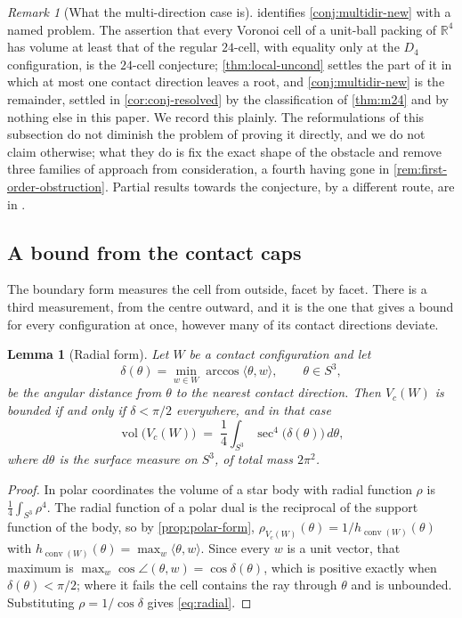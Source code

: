 \documentclass[11pt,reqno]{amsart}
\renewcommand{\_}{\origunderscore\allowbreak}
\numberwithin{equation}{section}
\theoremstyle{plain}
\newtheorem{lem}[thm]{Lemma}
\theoremstyle{definition}
\theoremstyle{remark}
\newtheorem{remark}[thm]{Remark}
\DeclareMathOperator{\vol}{vol}
\DeclareMathOperator{\conv}{conv}
\begin{document}
\begin{remark}[What the multi-direction case is]\label{rem:is-24cell}
 identifies \cref{conj:multidir-new} with a named
problem. The assertion that every Voronoi cell of a unit-ball
packing of $\mathbb{R}^4$ has volume at least that of the regular
$24$-cell, with equality only at the $D_4$ configuration, is the
$24$-cell conjecture; \cref{thm:local-uncond} settles the part of it in
which at most one contact direction leaves a root, and
\cref{conj:multidir-new} is the remainder, settled in
\cref{cor:conj-resolved} by the classification of \cref{thm:m24} and by
nothing else in this paper. We record this plainly. The reformulations
of this subsection do not diminish the problem of proving it directly,
and we do not claim otherwise; what they do is fix the exact shape of
the obstacle and remove three families of approach from consideration,
a fourth having gone in \cref{rem:first-order-obstruction}. Partial
results towards the conjecture, by a different route, are in
\cite{Mus18}.
\end{remark}

\subsection{A bound from the contact caps}\label{sec:covering-bound}

The boundary form measures the cell from outside, facet by facet. There
is a third measurement, from the centre outward, and it is the one that
gives a bound for every configuration at once, however many of its
contact directions deviate.

\begin{lem}[Radial form]\label{lem:radial-form}
Let $W$ be a contact configuration and let
\[
  \delta(\theta)=\min_{w\in W}\arccos\langle\theta,w\rangle ,
  \qquad \theta\in S^3,
\]
be the angular distance from $\theta$ to the nearest contact direction.
Then $V_c(W)$ is bounded if and only if $\delta<\pi/2$ everywhere, and in
that case
\begin{equation}\label{eq:radial}
  \vol\bigl(V_c(W)\bigr)
  \;=\;\frac14\int_{S^3}\sec^4\bigl(\delta(\theta)\bigr)\,d\theta ,
\end{equation}
where $d\theta$ is the surface measure on $S^3$, of total mass
$2\pi^2$.
\end{lem}

\begin{proof}
In polar coordinates the volume of a star body with radial function
$\rho$ is $\tfrac14\int_{S^3}\rho^4$. The radial function of a polar
dual is the reciprocal of the support function of the body, so by
\cref{prop:polar-form},
$\rho_{V_c(W)}(\theta)=1/h_{\conv(W)}(\theta)$ with
$h_{\conv(W)}(\theta)=\max_{w}\langle\theta,w\rangle$. Since every
$w$ is a unit vector, that maximum is
$\max_w\cos\angle(\theta,w)=\cos\delta(\theta)$, which is positive
exactly when $\delta(\theta)<\pi/2$; where it fails the cell contains
the ray through $\theta$ and is unbounded. Substituting
$\rho=1/\cos\delta$ gives \eqref{eq:radial}.
\end{proof}
\end{document}
